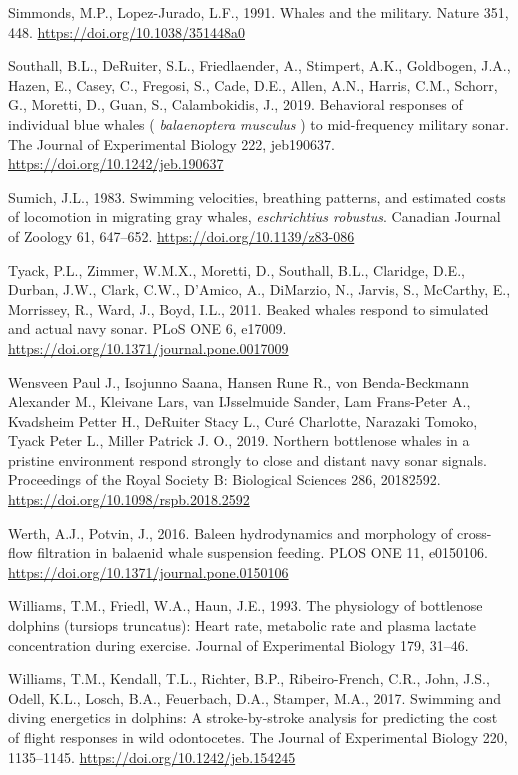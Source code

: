 \documentclass[]{elsarticle} %
\begin{document}
\hypertarget{ref-simmonds_whales_1991}{}
Simmonds, M.P., Lopez-Jurado, L.F., 1991. Whales and the military.
Nature 351, 448. \url{https://doi.org/10.1038/351448a0}

\hypertarget{ref-southall_behavioral_2019}{}
Southall, B.L., DeRuiter, S.L., Friedlaender, A., Stimpert, A.K.,
Goldbogen, J.A., Hazen, E., Casey, C., Fregosi, S., Cade, D.E., Allen,
A.N., Harris, C.M., Schorr, G., Moretti, D., Guan, S., Calambokidis, J.,
2019. Behavioral responses of individual blue whales (
\emph{balaenoptera musculus} ) to mid-frequency military sonar. The
Journal of Experimental Biology 222, jeb190637.
\url{https://doi.org/10.1242/jeb.190637}

\hypertarget{ref-sumich_swimming_1983}{}
Sumich, J.L., 1983. Swimming velocities, breathing patterns, and
estimated costs of locomotion in migrating gray whales,
\emph{eschrichtius robustus}. Canadian Journal of Zoology 61, 647--652.
\url{https://doi.org/10.1139/z83-086}

\hypertarget{ref-tyack_beaked_2011}{}
Tyack, P.L., Zimmer, W.M.X., Moretti, D., Southall, B.L., Claridge,
D.E., Durban, J.W., Clark, C.W., D'Amico, A., DiMarzio, N., Jarvis, S.,
McCarthy, E., Morrissey, R., Ward, J., Boyd, I.L., 2011. Beaked whales
respond to simulated and actual navy sonar. PLoS ONE 6, e17009.
\url{https://doi.org/10.1371/journal.pone.0017009}

\hypertarget{ref-wensveen_paul_j._northern_2019}{}
Wensveen Paul J., Isojunno Saana, Hansen Rune R., von Benda-Beckmann
Alexander M., Kleivane Lars, van IJsselmuide Sander, Lam Frans-Peter A.,
Kvadsheim Petter H., DeRuiter Stacy L., Curé Charlotte, Narazaki Tomoko,
Tyack Peter L., Miller Patrick J. O., 2019. Northern bottlenose whales
in a pristine environment respond strongly to close and distant navy
sonar signals. Proceedings of the Royal Society B: Biological Sciences
286, 20182592. \url{https://doi.org/10.1098/rspb.2018.2592}

\hypertarget{ref-werth_baleen_2016}{}
Werth, A.J., Potvin, J., 2016. Baleen hydrodynamics and morphology of
cross-flow filtration in balaenid whale suspension feeding. PLOS ONE 11,
e0150106. \url{https://doi.org/10.1371/journal.pone.0150106}

\hypertarget{ref-williams_physiology_1993}{}
Williams, T.M., Friedl, W.A., Haun, J.E., 1993. The physiology of
bottlenose dolphins (tursiops truncatus): Heart rate, metabolic rate and
plasma lactate concentration during exercise. Journal of Experimental
Biology 179, 31--46.

\hypertarget{ref-williams_swimming_2017}{}
Williams, T.M., Kendall, T.L., Richter, B.P., Ribeiro-French, C.R.,
John, J.S., Odell, K.L., Losch, B.A., Feuerbach, D.A., Stamper, M.A.,
2017. Swimming and diving energetics in dolphins: A stroke-by-stroke
analysis for predicting the cost of flight responses in wild
odontocetes. The Journal of Experimental Biology 220, 1135--1145.
\url{https://doi.org/10.1242/jeb.154245}
\end{document}

